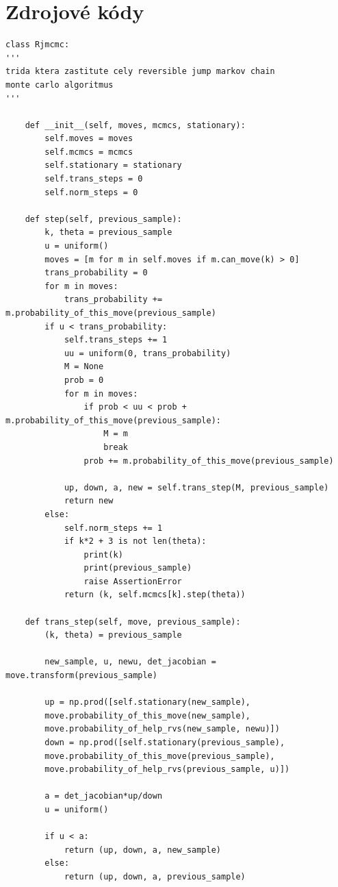 \documentclass[czech,master,public,dept470,male,cpdeclaration,oneside, python]{diploma}
\begin{document}
\section{Zdrojové kódy}
\begin{lstlisting}[caption=RJMCMC]
class Rjmcmc:
'''
trida ktera zastitute cely reversible jump markov chain
monte carlo algoritmus
'''

	def __init__(self, moves, mcmcs, stationary):
		self.moves = moves
		self.mcmcs = mcmcs
		self.stationary = stationary
		self.trans_steps = 0
		self.norm_steps = 0

	def step(self, previous_sample):
		k, theta = previous_sample
		u = uniform()
		moves = [m for m in self.moves if m.can_move(k) > 0]
		trans_probability = 0
		for m in moves:
			trans_probability += m.probability_of_this_move(previous_sample)
		if u < trans_probability:
			self.trans_steps += 1
			uu = uniform(0, trans_probability)
			M = None
			prob = 0
			for m in moves:
				if prob < uu < prob + m.probability_of_this_move(previous_sample):
					M = m
					break
				prob += m.probability_of_this_move(previous_sample)

			up, down, a, new = self.trans_step(M, previous_sample)
			return new
		else:
			self.norm_steps += 1
			if k*2 + 3 is not len(theta):
				print(k)
				print(previous_sample)
				raise AssertionError
			return (k, self.mcmcs[k].step(theta))

	def trans_step(self, move, previous_sample):
		(k, theta) = previous_sample

		new_sample, u, newu, det_jacobian = move.transform(previous_sample)

		up = np.prod([self.stationary(new_sample),
		move.probability_of_this_move(new_sample),
		move.probability_of_help_rvs(new_sample, newu)])
		down = np.prod([self.stationary(previous_sample),
		move.probability_of_this_move(previous_sample),
		move.probability_of_help_rvs(previous_sample, u)])

		a = det_jacobian*up/down
		u = uniform()

		if u < a:
			return (up, down, a, new_sample)
		else:
			return (up, down, a, previous_sample)
\end{lstlisting}
\newpage
\end{document}
